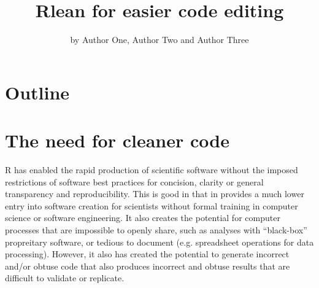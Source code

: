 \title{Rlean for easier code editing}
\author{by Author One, Author Two and Author Three}

\maketitle


\section{Outline}




\section{The need for cleaner code}

R has enabled the rapid production of scientific software without the
imposed restrictions of software best practices for concision, clarity
or general transparency and reproducibility. This is good in that in
provides a much lower entry into software creation for scientists
without formal training in computer science or software
engineering. It also creates the potential for computer processes that
are impossible to openly share, such as analyses with ``black-box''
propreitary software, or tedious to document (e.g. spreadsheet
operations for data processing). However, it also has created the
potential to generate incorrect and/or obtuse code that also produces
incorrect and obtuse results that are difficult to validate or
replicate. 

